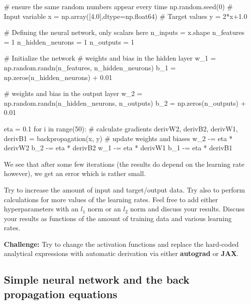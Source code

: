 \documentclass[%
oneside,                 %
final,                   %
10pt]{article}
\newenvironment{doconceexercise}{}{}
\newcounter{doconceexercisecounter}
\begin{document}
# ensure the same random numbers appear every time
np.random.seed(0)
# Input variable
x = np.array([4.0],dtype=np.float64)
# Target values
y = 2*x+1.0 

# Defining the neural network, only scalars here
n_inputs = x.shape
n_features = 1
n_hidden_neurons = 1
n_outputs = 1

# Initialize the network
# weights and bias in the hidden layer
w_1 = np.random.randn(n_features, n_hidden_neurons)
b_1 = np.zeros(n_hidden_neurons) + 0.01

# weights and bias in the output layer
w_2 = np.random.randn(n_hidden_neurons, n_outputs)
b_2 = np.zeros(n_outputs) + 0.01

eta = 0.1
for i in range(50):
    # calculate gradients
    derivW2, derivB2, derivW1, derivB1 = backpropagation(x, y)
    # update weights and biases
    w_2 -= eta * derivW2
    b_2 -= eta * derivB2
    w_1 -= eta * derivW1
    b_1 -= eta * derivB1



\epycod


We see that after some few iterations (the results do depend on the learning rate however), we get an error which is rather small.


\begin{doconceexercise}

                             

Try to increase the amount of input and
target/output data. Try also to perform calculations for more values
of the learning rates. Feel free to add either hyperparameters with an
$l_1$ norm or an $l_2$ norm and discuss your results.
Discuss your results as functions of the amount of training data and various learning rates.

\textbf{Challenge:} Try to change the activation functions and replace the hard-coded analytical expressions with automatic derivation via either \textbf{autograd} or \textbf{JAX}.

\end{doconceexercise}

\subsection{Simple neural network and the  back propagation equations}
\end{document}
